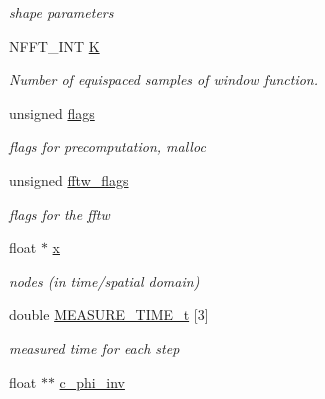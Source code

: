 \begin{DoxyCompactItemize}
\begin{DoxyCompactList}\small\item\em shape parameters \end{DoxyCompactList}\item 
N\-F\-F\-T\-\_\-\-I\-N\-T \hyperlink{structnfstf__plan_a4a4c81d83b870102d5c6ee913d64924a}{K}
\begin{DoxyCompactList}\small\item\em Number of equispaced samples of window function. \end{DoxyCompactList}\item 
\hypertarget{structnfstf__plan_a3fbe38e9fabdd591668f1dfbcab153e3}{unsigned \hyperlink{structnfstf__plan_a3fbe38e9fabdd591668f1dfbcab153e3}{flags}}\label{structnfstf__plan_a3fbe38e9fabdd591668f1dfbcab153e3}

\begin{DoxyCompactList}\small\item\em flags for precomputation, malloc \end{DoxyCompactList}\item 
\hypertarget{structnfstf__plan_a9da018cd24e707e57ed0c8cac82f5301}{unsigned \hyperlink{structnfstf__plan_a9da018cd24e707e57ed0c8cac82f5301}{fftw\-\_\-flags}}\label{structnfstf__plan_a9da018cd24e707e57ed0c8cac82f5301}

\begin{DoxyCompactList}\small\item\em flags for the fftw \end{DoxyCompactList}\item 
\hypertarget{structnfstf__plan_ad0d1772e5947f4395cbfa0fc2ed39018}{float $\ast$ \hyperlink{structnfstf__plan_ad0d1772e5947f4395cbfa0fc2ed39018}{x}}\label{structnfstf__plan_ad0d1772e5947f4395cbfa0fc2ed39018}

\begin{DoxyCompactList}\small\item\em nodes (in time/spatial domain) \end{DoxyCompactList}\item 
\hypertarget{structnfstf__plan_a369d8545639fccbf73f9daf7dcb94fe8}{double \hyperlink{structnfstf__plan_a369d8545639fccbf73f9daf7dcb94fe8}{M\-E\-A\-S\-U\-R\-E\-\_\-\-T\-I\-M\-E\-\_\-t} \mbox{[}3\mbox{]}}\label{structnfstf__plan_a369d8545639fccbf73f9daf7dcb94fe8}

\begin{DoxyCompactList}\small\item\em measured time for each step \end{DoxyCompactList}\item 
\hypertarget{structnfstf__plan_a9d59ca4338fe39f2e22f4e5d3155deba}{float $\ast$$\ast$ \hyperlink{structnfstf__plan_a9d59ca4338fe39f2e22f4e5d3155deba}{c\-\_\-phi\-\_\-inv}}\label{structnfstf__plan_a9d59ca4338fe39f2e22f4e5d3155deba}


\end{DoxyCompactItemize}
